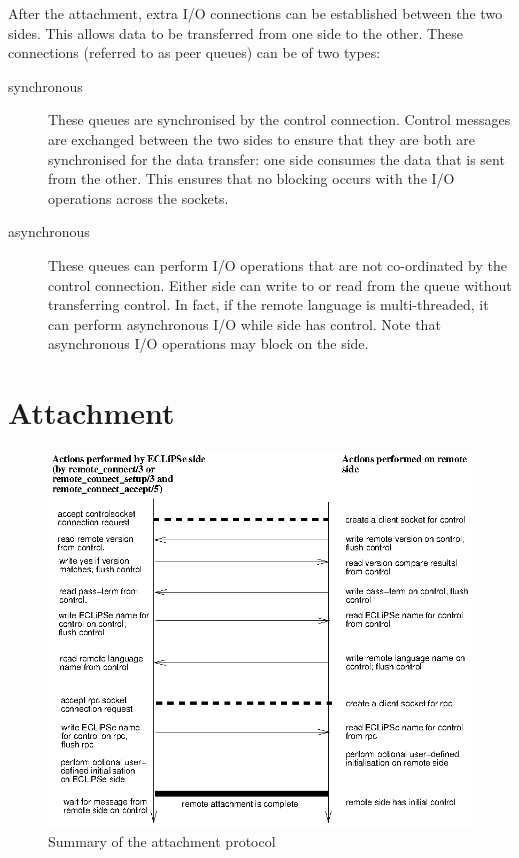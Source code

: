 After the attachment, extra I/O connections can be established between the
two sides. This allows data to be transferred from one side to the other.
These connections (referred to as peer queues) can be of two types:

\begin{description}
\item[synchronous] These queues are synchronised by the control
connection. Control messages are exchanged between the two sides to ensure
that they are both are synchronised for the data transfer: one side
consumes the data that is sent from the other. This ensures that no
blocking occurs with the I/O operations across the sockets.

\item[asynchronous] These queues can perform I/O operations that are not
 co-ordinated by the control 
connection. Either side can write to or read from the queue 
without transferring control. In fact, if the remote language is
multi-threaded, it can perform asynchronous I/O while {\eclipse}
side has control. Note that asynchronous I/O
operations may block on the {\eclipse} side. 

\end{description}

\section{Attachment}
\label{remoteattach}

\begin{figure}[hbt]
\begin{center}
\includegraphics{remoteconnect.ps}
\end{center}
\caption{Summary of the attachment protocol}
\label{rattach}
\end{figure}


